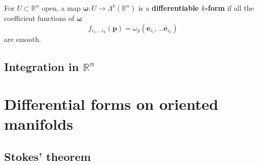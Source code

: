 \documentclass[letter-paper]{tufte-book}
\begin{document}
For $U\subset \mathbb{R}^n$ open, a map $\boldsymbol{\omega} : U \to \Lambda^k(\mathbb{R}^n)$ is a \textbf{differentiable $k$-form} if all the coefficient functions of $\boldsymbol{\omega}$
\begin{equation}
  f_{i_1, \ldots i_k}(\boldsymbol{p}) = \omega_p(\boldsymbol{e}_{i_1}, \ldots \boldsymbol{e}_{i_k})
\end{equation}
are smooth.


\section{Integration in $\mathbb{R}^n$}


\chapter{Differential forms on oriented manifolds}


\section{Stokes' theorem}








\mainmatter




%


\end{document}
